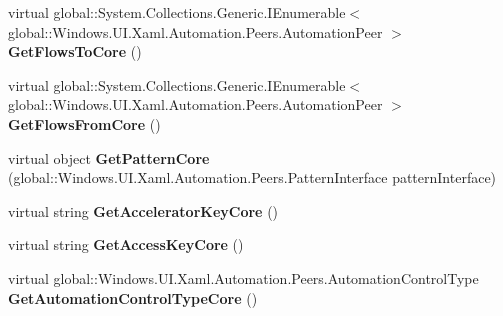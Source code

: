 \begin{DoxyCompactItemize}
\item 
\mbox{\label{class_windows_1_1_u_i_1_1_xaml_1_1_automation_1_1_peers_1_1_automation_peer_a539ef8ed84355a4ed89c67cfc12b13cb}} 
virtual global\+::\+System.\+Collections.\+Generic.\+I\+Enumerable$<$ global\+::\+Windows.\+U\+I.\+Xaml.\+Automation.\+Peers.\+Automation\+Peer $>$ {\bfseries Get\+Flows\+To\+Core} ()
\item 
\mbox{\label{class_windows_1_1_u_i_1_1_xaml_1_1_automation_1_1_peers_1_1_automation_peer_af28cc07b8f441e466107608f74339c8f}} 
virtual global\+::\+System.\+Collections.\+Generic.\+I\+Enumerable$<$ global\+::\+Windows.\+U\+I.\+Xaml.\+Automation.\+Peers.\+Automation\+Peer $>$ {\bfseries Get\+Flows\+From\+Core} ()
\item 
\mbox{\label{class_windows_1_1_u_i_1_1_xaml_1_1_automation_1_1_peers_1_1_automation_peer_aa044472b4231fb26f5f1f9c526533020}} 
virtual object {\bfseries Get\+Pattern\+Core} (global\+::\+Windows.\+U\+I.\+Xaml.\+Automation.\+Peers.\+Pattern\+Interface pattern\+Interface)
\item 
\mbox{\label{class_windows_1_1_u_i_1_1_xaml_1_1_automation_1_1_peers_1_1_automation_peer_a9781a8d9c5fdebc0deb28ddc4586e09a}} 
virtual string {\bfseries Get\+Accelerator\+Key\+Core} ()
\item 
\mbox{\label{class_windows_1_1_u_i_1_1_xaml_1_1_automation_1_1_peers_1_1_automation_peer_a3d4baa373625c8c650d5f410d99b44ba}} 
virtual string {\bfseries Get\+Access\+Key\+Core} ()
\item 
\mbox{\label{class_windows_1_1_u_i_1_1_xaml_1_1_automation_1_1_peers_1_1_automation_peer_af2422569cceaff985ea73cae254225e7}} 
virtual global\+::\+Windows.\+U\+I.\+Xaml.\+Automation.\+Peers.\+Automation\+Control\+Type {\bfseries Get\+Automation\+Control\+Type\+Core} ()
\item 
\mbox{\label{class_windows_1_1_u_i_1_1_xaml_1_1_automation_1_1_peers_1_1_automation_peer_a014ee70abfd483498acd60d958afc21e}} 

\end{DoxyCompactItemize}
